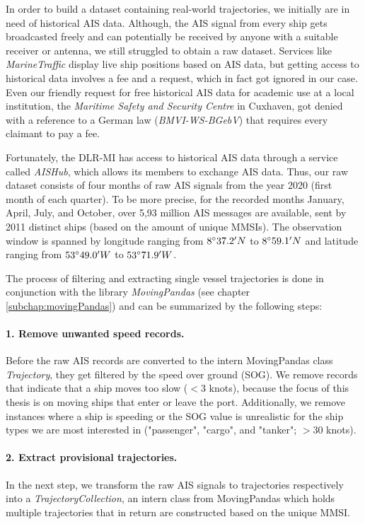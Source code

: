 In order to build a dataset containing real-world trajectories, we initially are in need of historical AIS data. Although, the AIS signal from every ship gets broadcasted freely and can potentially be received by anyone with a suitable receiver or antenna, we still struggled to obtain a raw dataset. Services like \textit{MarineTraffic} display live ship positions based on AIS data, but getting access to historical data involves a fee and a request, which in fact got ignored in our case. Even our friendly request for free historical AIS data for academic use at a local institution, the \textit{Maritime Safety and Security Centre} in Cuxhaven, got denied with a reference to a German law (\textit{BMVI-WS-BGebV}) that requires every claimant to pay a fee.
\par
Fortunately, the DLR-MI has access to historical AIS data through a service called \textit{AISHub}, which allows its members to exchange AIS data. Thus, our raw dataset consists of four months of raw AIS signals from the year 2020 (first month of each quarter). To be more precise, for the recorded months January, April, July, and  October, over 5,93 million AIS messages are available, sent by 2011 distinct ships (based on the amount of unique MMSIs). The observation window is spanned by longitude ranging from $8\degree37.2'N$ to $8\degree59.1'N$ and latitude ranging from $53\degree49.0'W$ to $53\degree71.9'W$.
\par
The process of filtering and extracting single vessel trajectories is done  in  conjunction  with  the  library \textit{MovingPandas} (see chapter \ref{subchap:movingPandas}) and can be summarized by the following steps:
\paragraph{1. Remove unwanted speed records.}
Before the raw AIS records are converted to the intern MovingPandas class \textit{Trajectory}, they get filtered by the speed over ground (SOG). We remove records that indicate that a ship moves too slow ($<3$ knots), because the focus of this thesis is on moving ships that enter or leave the port. Additionally, we remove instances where a ship is speeding or the SOG value is unrealistic for the ship types we are most interested in ("passenger", "cargo", and "tanker"; $>30$ knots).


\paragraph{2. Extract provisional trajectories.}
In the next step, we transform the raw AIS signals to trajectories respectively into a \textit{TrajectoryCollection}, an intern class from MovingPandas which holds multiple trajectories that in return are constructed based on the unique MMSI. 

